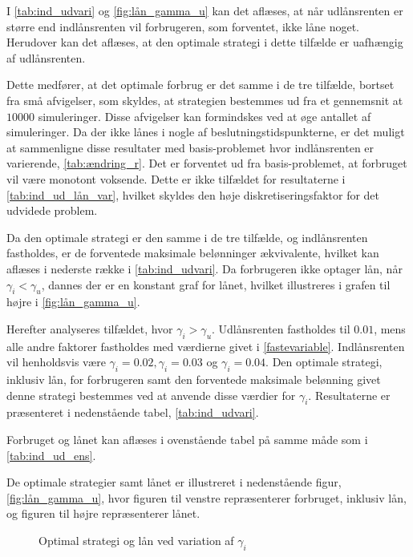 I \autoref{tab:ind_udvari} og \autoref{fig:lån_gamma_u} kan det aflæses, at når udlånsrenten er større end indlånsrenten vil forbrugeren, som forventet, ikke låne noget. Herudover kan det aflæses, at den optimale strategi i dette tilfælde er uafhængig af udlånsrenten. 

Dette medfører, at det optimale forbrug er det samme i de tre tilfælde, bortset fra små afvigelser, som skyldes, at strategien bestemmes ud fra et gennemsnit at $10000$ simuleringer. Disse afvigelser kan formindskes ved at øge antallet af simuleringer. Da der ikke lånes i nogle af beslutningstidspunkterne, er det muligt at sammenligne disse resultater med basis-problemet hvor indlånsrenten er varierende, \autoref{tab:ændring_r}. Det er forventet ud fra basis-problemet, at forbruget vil være monotont voksende. Dette er ikke tilfældet for resultaterne i \autoref{tab:ind_ud_lån_var}, hvilket skyldes den høje diskretiseringsfaktor for det udvidede problem.

Da den optimale strategi er den samme i de tre tilfælde, og indlånsrenten fastholdes, er de forventede maksimale belønninger ækvivalente, hvilket kan aflæses i nederste række i \autoref{tab:ind_udvari}. Da forbrugeren ikke optager lån, når $\gamma_i < \gamma_u$, dannes der er en konstant graf for lånet, hvilket illustreres i grafen til højre i \autoref{fig:lån_gamma_u}.

Herefter analyseres tilfældet, hvor $\gamma_i > \gamma_u$. Udlånsrenten fastholdes til $0.01$, mens alle andre faktorer fastholdes med værdierne givet i \eqref{fastevariable}. Indlånsrenten vil henholdsvis være $\gamma_i = 0.02,  \gamma_i = 0.03$ og $ \gamma_i = 0.04$. Den optimale strategi, inklusiv lån, for forbrugeren samt den forventede maksimale belønning givet denne strategi bestemmes ved at anvende disse værdier for $\gamma_i$. Resultaterne er præsenteret i nedenstående tabel, \autoref{tab:ind_udvari}.
%

%
Forbruget og lånet kan aflæses i ovenstående tabel på samme måde som i \autoref{tab:ind_ud_ens}. 

De optimale strategier samt lånet er illustreret i nedenstående figur, \autoref{fig:lån_gamma_u}, hvor figuren til venstre repræsenterer forbruget, inklusiv lån, og figuren til højre repræsenterer lånet.  


\begin{figure}[H]
    \begin{center}
        \resizebox{8cm}{!}{}
        \resizebox{8cm}{!}{}
    \end{center}
    \caption{Optimal strategi og lån ved variation af $\gamma_i$ }\label{fig:lån_gamma_i}
\end{figure}

